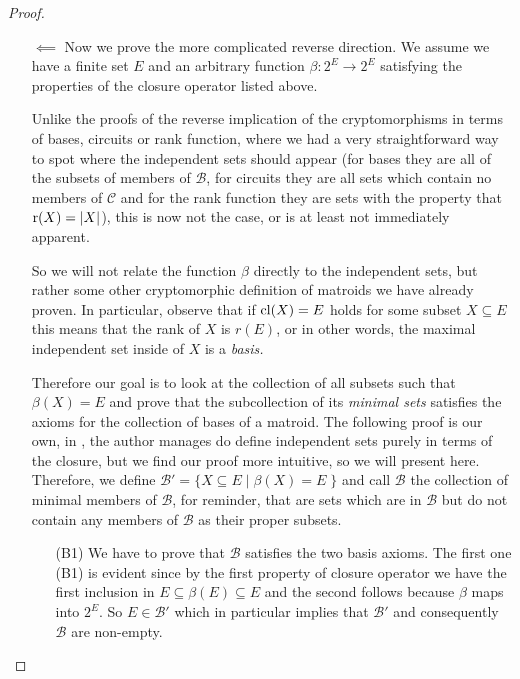 \begin{proof}
\begin{enumerate}
    \item[$\impliedby$] Now we prove the more complicated reverse direction. We assume we have a finite set $E$ and an arbitrary function $\beta : 2^E \to 2^E$ satisfying the properties of the closure operator listed above.

    Unlike the proofs of the reverse implication of the cryptomorphisms in terms of bases, circuits or rank function, where we had a very straightforward way to spot where the independent sets should appear (for bases they are all of the subsets of members of $\mathcal{B}$, for circuits they are all sets which contain no members of $\mathcal{C}$ and for the rank function they are sets with the property that $\operatorname{r}(X) = |X|$), this is now not the case, or is at least not immediately apparent.

    So we will not relate the function $\beta$ directly to the independent sets, but rather some other cryptomorphic definition of matroids we have already proven. In particular, observe that if $\mathrm{cl}(X) = E$ holds for some subset $X \subseteq E$ this means that the rank of $X$ is $r(E)$, or in other words, the maximal independent set inside of $X$ is a \textit{basis.}

    Therefore our goal is to look at the collection of all subsets such that $\beta(X)= E$ and prove that the subcollection of its \textit{minimal sets} satisfies the axioms for the collection of bases of a matroid. The following proof is our own, in \cite[p. 27]{oxley1}, the author manages do define independent sets purely in terms of the closure, but we find our proof more intuitive, so we will present here. Therefore, we define $\mathcal{B}' = \{X \subseteq E\; |\; \beta(X) = E\;\}$ and call $\mathcal{B}$ the collection of minimal members of $\mathcal{B}$, for reminder, that are sets which are in $\mathcal{B}$ but do not contain any members of $\mathcal{B}$ as their proper subsets.


\begin{enumerate}

\item[(B1)] We have to prove that $\mathcal{B}$ satisfies the two basis axioms. The first one (B1) is evident since by the first property of closure operator we have the first inclusion in $E\subseteq\beta(E) \subseteq E$ and the second follows because $\beta$ maps into $2^E$. So $E \in \mathcal{B}'$ which in particular implies that $\mathcal{B}'$ and consequently $\mathcal{B}$ are non-empty.


\end{enumerate}
\end{enumerate}
\end{proof}
